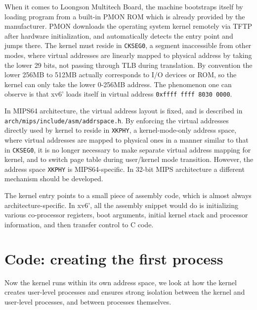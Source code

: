\documentclass{report}
\newenvironment{hilight}{\color{red}}{\color{black}}
\begin{document}
	\begin{hilight}
		When it comes to Loongson Multitech Board, the machine bootstraps
		itself by loading program from a built-in PMON ROM which is already provided by the
		manufacturer.  PMON downloads the operating system kernel remotely via TFTP after hardware
		initialization, and automatically detects the entry point and jumps there.  The kernel must
		reside in \texttt{CKSEG0}, a segment inaccessible from other modes, 
		where virtual addresses are linearly mapped to physical address by taking
		the lower 29 bits, not passing through TLB during translation.  By convention the
		lower 256MB to 512MB actually corresponds to I/O devices or ROM, so the kernel can only
		take the lower 0-256MB address.  The phenomenon one can observe is that xv6' loads itself
		in virtual address \texttt{0xffff ffff 8030 0000}.
		
		In MIPS64 architecture, the virtual address layout is fixed, and is described
		in \texttt{arch/mips/include/asm/addrspace.h}.  By enforcing the virtual addresses
		directly used by kernel to reside in \texttt{XKPHY}, a kernel-mode-only address space,
		where virtual addresses are mapped to physical ones in a manner similar to that in \texttt{CKSEG0},
		it is no longer necessary to make separate virtual address mapping for kernel, and to switch page
		table during user/kernel mode transition.  However, the address space \texttt{XKPHY} is
		MIPS64-specific.  In 32-bit MIPS architecture a different mechanism should be developed.

		The kernel entry points to a small piece of assembly code,
		which is almost always architecture-specific.  In xv6', all the assembly snippet would do is
		initializing various co-processor registers, boot arguments, initial kernel stack and processor
		information, and then transfer control to C code.
		\marginpar{
			\footnotesize\ttfamily
			\textcolor{red}{kern/init.c}
		}
	\end{hilight}
	
	\section{Code: creating the first process}
	Now the kernel runs within its own address space, we look at how the kernel creates 
	user-level processes and ensures strong isolation between the kernel and user-level
	processes, and between processes themselves.
	
\end{document}
